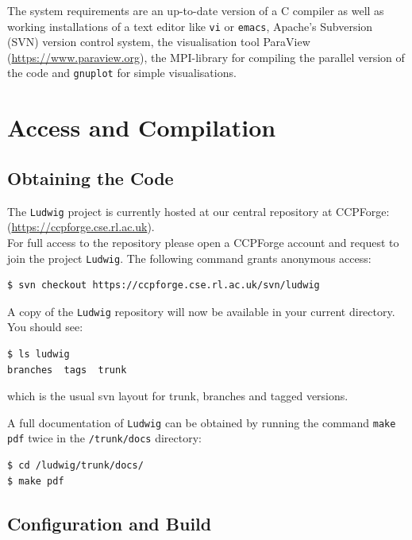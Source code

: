 \documentclass[11pt,twoside,a4paper]{article}
\begin{document}
The system requirements are an up-to-date version of a C compiler as well as working installations 
of a text editor like \texttt{vi} or \texttt{emacs}, Apache's Subversion (SVN) version control system, the visualisation tool
ParaView (\hyperref[ParaView]{https://www.paraview.org}), the MPI-library 
for compiling the parallel version of the code and \texttt{gnuplot} for simple visualisations.

\section{Access and Compilation}

\subsection{Obtaining the Code}
\label{sec:getCode}

The \texttt{Ludwig} project is currently hosted at our central repository 
at CCPForge:\\
(\hyperref[CCPForge]{https://ccpforge.cse.rl.ac.uk}).\\
For full access to the repository please open a CCPForge account and request
to join the project \texttt{Ludwig}. The following command grants anonymous access:

\begin{lstlisting}[style=terminalverbatim]
$ svn checkout https://ccpforge.cse.rl.ac.uk/svn/ludwig
\end{lstlisting}

A copy of the \texttt{Ludwig} repository will now be available in your current directory. 
You should see:

\begin{lstlisting}
$ ls ludwig
branches  tags  trunk
\end{lstlisting}
which is the usual svn layout for trunk, branches and tagged versions.

A full documentation of \texttt{Ludwig} can be obtained by running 
the command \texttt{make pdf} twice in the \texttt{/trunk/docs} directory:

\begin{lstlisting}[style=terminalverbatim]
$ cd /ludwig/trunk/docs/
$ make pdf
\end{lstlisting}

\subsection{Configuration and Build}\label{configbuild}
\end{document}
